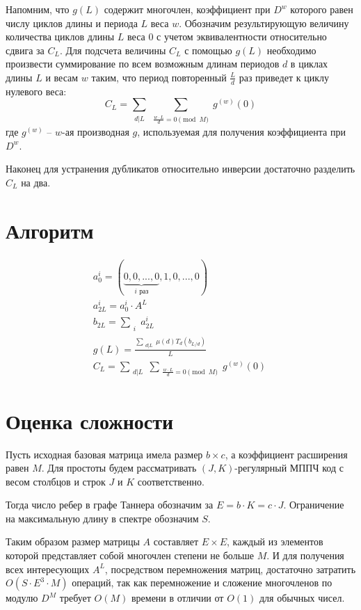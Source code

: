 \documentclass[specification,annotation,times]{itmo-student-thesis}
\begin{document}
Напомним, что $g(L)$ содержит многочлен, коэффициент при $D^w$ которого равен числу циклов длины и периода $L$ веса $w$.
Обозначим результирующую величину количества циклов длины $L$ веса 0 с учетом эквивалентности относительно сдвига за $C_L$.
Для подсчета величины $C_L$ с помощью $g(L)$ необходимо произвести суммирование по всем возможным длинам периодов $d$ в циклах
длины $L$ и весам $w$ таким, что период повторенный $\frac{L}{d}$ раз приведет к циклу нулевого веса:
\[
  C_L=\sum_{\substack{d|L}}\sum_{\substack{\frac{w \cdot L}{d} = 0 \pmod{M}}}g^{(w)}(0)
\]
где $g^{(w)}$ -- $w$-ая производная $g$, используемая для получения коэффициента при $D^w$.

Наконец для устранения дубликатов относительно инверсии достаточно разделить $C_L$ на два.

\section{Алгоритм}
\begin{eqnarray}
a_0^i=(\underbrace{0,0,...,0}_{i \text{ раз}},1,0,...,0) \label{aeq1} \\
a_{2L}^i=a_0^i \cdot A^L \label{aeq2} \\
b_{2L}=\sum_{\substack{i}}a_{2L}^i \label{aeq3} \\
  g(L) = \frac{\sum_{\substack{d|L}}\mu(d)T_d(b_{L/d})}{L} \label{aeq4} \\
  C_L=\sum_{\substack{d|L}}\sum_{\substack{\frac{w \cdot L}{d} = 0 \pmod{M}}}g^{(w)}(0) \label{aeq5} \
\end{eqnarray}

\section{Оценка сложности}

 Пусть исходная базовая  матрица имела размер $b \times c$, а коэффициент расширения равен $M$.
Для простоты будем рассматривать $(J,K)$-регулярный МППЧ код с 
весом столбцов и строк $J$ и $K$ соответственно. 

Тогда число ребер в графе Таннера обозначим за $E=b \cdot K = c \cdot J$.
Ограничение на максимальную длину в спектре обозначим $S$.

Таким образом размер матрицы $A$ составляет $E \times E$, каждый из элементов которой представляет
собой многочлен степени не больше $M$. И для получения
всех интересующих $A^L$, посредством перемножения матриц,
достаточно затратить $O(S \cdot E^3 \cdot M)$ операций, так как перемножение и сложение многочленов по модулю $D^M$
требует $O(M)$ времени в отличии от $O(1)$ для обычных чисел.
\end{document}
